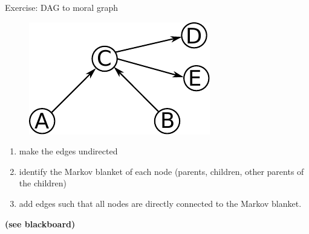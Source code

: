 \begin{frame}

Exercise: DAG to moral graph

\begin{figure}[h]
	\centering
	\includegraphics[width=0.3\linewidth]{img/dag1}%
    \label{fig:cond}%
\end{figure}

\begin{enumerate}
\item make the edges undirected
\item identify the Markov blanket of each node (parents, children, other parents of the children)
\item add edges such that all nodes are directly connected to the Markov blanket.
\end{enumerate}


\textbf{(see blackboard)}
    
\end{frame}
